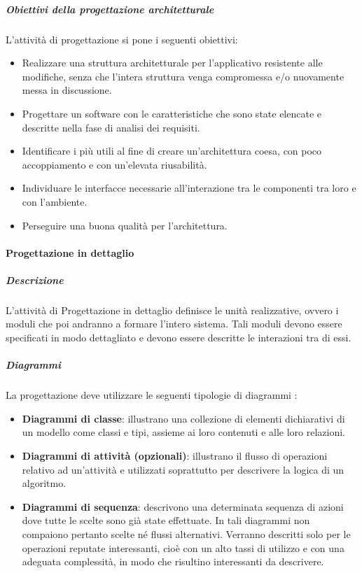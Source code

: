 \subparagraph{Obiettivi della progettazione architetturale}
L'attività di progettazione si pone i seguenti obiettivi:
\begin{itemize}
\item Realizzare una struttura architetturale per l'applicativo  resistente alle modifiche, senza che l'intera struttura venga compromessa e/o nuovamente messa in discussione.
\item Progettare un software con le caratteristiche che sono state elencate e descritte nella fase di analisi dei requisiti.
\item Identificare i  più utili al fine di creare un'architettura coesa, con poco accoppiamento e con un'elevata riusabilità.
\item Individuare le interfacce necessarie all'interazione tra le componenti tra loro e con l'ambiente.
\item Perseguire una buona qualità per l'architettura.
\end{itemize}

\paragraph{Progettazione in dettaglio}

\subparagraph{Descrizione}
L'attività di Progettazione in dettaglio definisce le unità realizzative, ovvero i moduli che poi andranno a formare l'intero sistema. Tali moduli devono essere specificati in modo dettagliato e devono essere descritte le interazioni tra di essi.

\subparagraph{Diagrammi}
La progettazione deve utilizzare le seguenti tipologie di diagrammi :
\begin{itemize}
\item
\textbf{Diagrammi di classe}: illustrano una collezione di elementi dichiarativi di un modello come classi e tipi, assieme ai loro contenuti e alle loro relazioni.
\item
\textbf{Diagrammi di attività (opzionali)}: illustrano il flusso di operazioni relativo ad un'attività e utilizzati soprattutto per descrivere la logica di un algoritmo.
\item
\textbf{Diagrammi di sequenza}: descrivono una determinata sequenza di azioni dove tutte le scelte sono già state effettuate. In tali diagrammi non compaiono pertanto scelte né flussi alternativi. Verranno descritti solo per le operazioni reputate interessanti, cioè con un alto tassi di utilizzo e con una adeguata complessità, in modo che risultino interessanti da descrivere.
\end{itemize}

